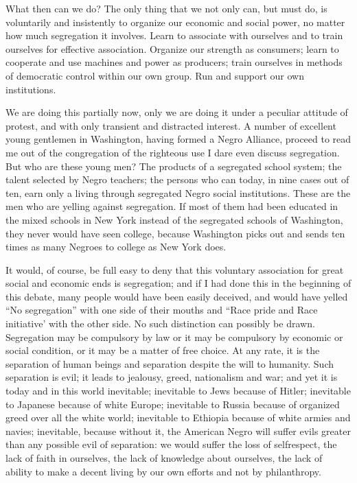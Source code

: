 \documentclass[letterpaper,10pt,english]{jupyterBook}
\begin{document}
\sphinxAtStartPar
What then can we do? The only thing that we not only can, but must do, is voluntarily and insistently to organize our economic and social power, no matter how much segregation it involves. Learn to associate with ourselves and to train ourselves for effective association. Organize our strength as consumers; learn to co\sphinxhyphen{}operate and use machines and power as producers; train ourselves in methods of democratic control within our own group. Run and support our own institutions.

\sphinxAtStartPar
We are doing this partially now, only we are doing it under a peculiar attitude of protest, and with only transient and distracted interest. A number of excellent young gentlemen in Washington, having formed a Negro Alliance, proceed to read me out of the congregation of the righteous use I dare even discuss segregation. But who are these young men? The products of a segregated school system; the talent selected by Negro teachers; the persons who can today, in nine cases out of ten, earn only a living through segregated Negro social institutions. These are the men who are yelling against segregation. If most of them had been educated in the mixed schools in New York instead of the segregated schools of Washington, they never would have seen college, because Washington picks out and sends ten times as many Negroes to college as New York does.

\sphinxAtStartPar
It would, of course, be full easy to deny that this voluntary association for great social and economic ends is segregation; and if I had done this in the beginning of this debate, many people would have been easily deceived, and would have yelled “No segregation” with one side of their mouths and “Race pride and Race initiative’ with the other side. No such distinction can possibly be drawn. Segregation may be compulsory by law or it may be compulsory by economic or social condition, or it may be a matter of free choice. At any rate, it is the separation of human beings and separation despite the will to humanity. Such separation is evil; it leads to jealousy, greed, nationalism and war; and yet it is today and in this world inevitable; inevitable to Jews because of Hitler; inevitable to Japanese because of white Europe; inevitable to Russia because of organized greed over all the white world; inevitable to Ethiopia because of white armies and navies; inevitable, because without it, the American Negro will suffer evils greater than any possible evil of separation: we would suffer the loss of self\sphinxhyphen{}respect, the lack of faith in ourselves, the lack of knowledge about ourselves, the lack of ability to make a decent living by our own efforts and not by philanthropy.
\end{document}

